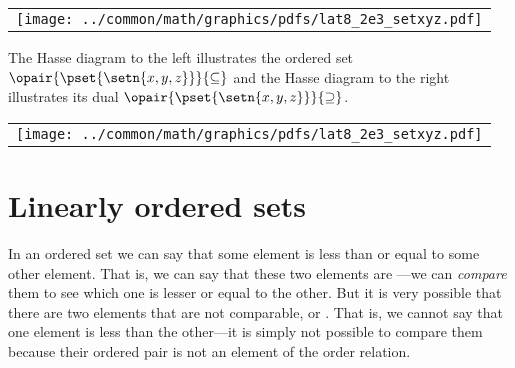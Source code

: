 %  
\begin{tabular}{c}%
  \texttt{[image: ../common/math/graphics/pdfs/lat8\_2e3\_setxyz.pdf]}%
\end{tabular}
\hfill%
\begin{minipage}{\tw-85mm}\raggedright
\begin{example}
The Hasse diagram to the left illustrates the ordered set 
$\opair{\pset{\setn{x,y,z}}}{\subseteq}$
and the Hasse diagram to the right illustrates its dual
$\opair{\pset{\setn{x,y,z}}}{\supseteq}$.
\end{example}
\end{minipage}%
\hfill
\begin{tabular}{c}%
  \texttt{[image: ../common/math/graphics/pdfs/lat8\_2e3\_setxyz.pdf]}%
\end{tabular}
%  







\section{Linearly ordered sets}

In an ordered set we can say that some element
is less than or equal to some other element.
That is, we can say that these two elements are ---we 
can \emph{compare} them to see which one is lesser or equal to
the other.
But it is very possible that there are two elements
that are not comparable, or .
That is, we cannot say that one element is less than the other---it is 
simply not possible to compare them because their ordered pair is not 
an element of the order relation.


